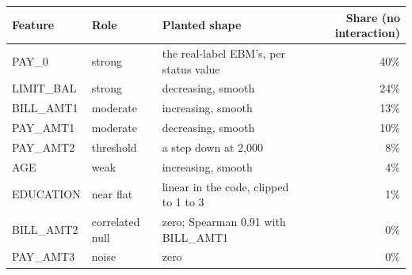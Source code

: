 \begin{tabular}{llp{7cm}r}
\toprule
\textbf{Feature} & \textbf{Role} & \textbf{Planted shape} & \textbf{Share (no interaction)} \\
\midrule
PAY\_0 & strong & the real-label EBM's, per status value & 40\% \\
LIMIT\_BAL & strong & decreasing, smooth & 24\% \\
BILL\_AMT1 & moderate & increasing, smooth & 13\% \\
PAY\_AMT1 & moderate & decreasing, smooth & 10\% \\
PAY\_AMT2 & threshold & a step down at 2,000 & 8\% \\
AGE & weak & increasing, smooth & 4\% \\
EDUCATION & near flat & linear in the code, clipped to 1 to 3 & 1\% \\
BILL\_AMT2 & correlated null & zero; Spearman 0.91 with BILL\_AMT1 & 0\% \\
PAY\_AMT3 & noise & zero & 0\% \\
\bottomrule
\end{tabular}
